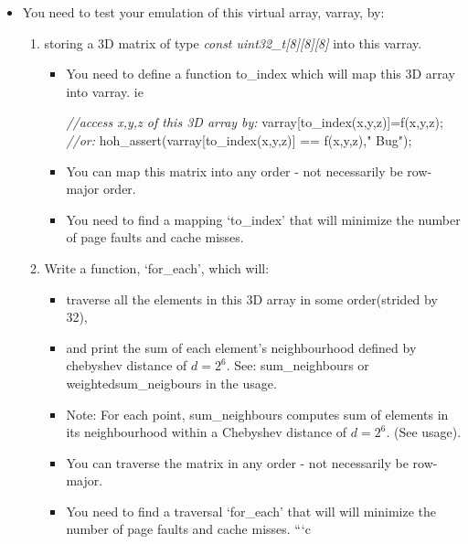 \documentclass[]{article}
\newenvironment{Shaded}{}{}
\newcommand{\StringTok}[1]{\textcolor[rgb]{0.87,0.00,0.00}{{#1}}}
\newcommand{\CommentTok}[1]{\textcolor[rgb]{0.50,0.50,0.50}{\textit{{#1}}}}
\newcommand{\NormalTok}[1]{{#1}}
\providecommand{\tightlist}{%
  \setlength{\itemsep}{0pt}\setlength{\parskip}{0pt}}
\begin{document}
\begin{itemize}
\tightlist
\item
  You need to test your emulation of this virtual array, varray, by:

  \begin{enumerate}
  \def\labelenumi{\arabic{enumi}.}
  \tightlist
  \item
    storing a 3D matrix of type \emph{const
    uint32\_t{[}8{]}{[}8{]}{[}8{]}} into this varray.

    \begin{itemize}
    \item
      You need to define a function to\_index which will map this 3D
      array into varray. ie

\begin{Shaded}
\begin{Highlighting}[]
\CommentTok{//access x,y,z of this 3D array by:}
\NormalTok{varray[to_index(x,y,z)]=f(x,y,z);}
\CommentTok{//or:}
\NormalTok{hoh_assert(varray[to_index(x,y,z)] == f(x,y,z),}\StringTok{" Bug"}\NormalTok{);}
\end{Highlighting}
\end{Shaded}
    \item
      You can map this matrix into any order - not necessarily be
      row-major order.
    \item
      You need to find a mapping `to\_index' that will minimize the
      number of page faults and cache misses.
    \end{itemize}
  \item
    Write a function, `for\_each', which will:

    \begin{itemize}
    \tightlist
    \item
      traverse all the elements in this 3D array in some order(strided
      by 32),
    \item
      and print the sum of each element's neighbourhood defined by
      chebyshev distance of \(d=2^6\). See: sum\_neighbours or
      weightedsum\_neigbours in the usage.
    \item
      Note: For each point, sum\_neighbours computes sum of elements in
      its neighbourhood within a Chebyshev distance of \(d=2^6\). (See
      usage).
    \item
      You can traverse the matrix in any order - not necessarily be
      row-major.
    \item
      You need to find a traversal `for\_each' that will will minimize
      the number of page faults and cache misses. ```c
    \end{itemize}
  \end{enumerate}
\end{itemize}
\end{document}
